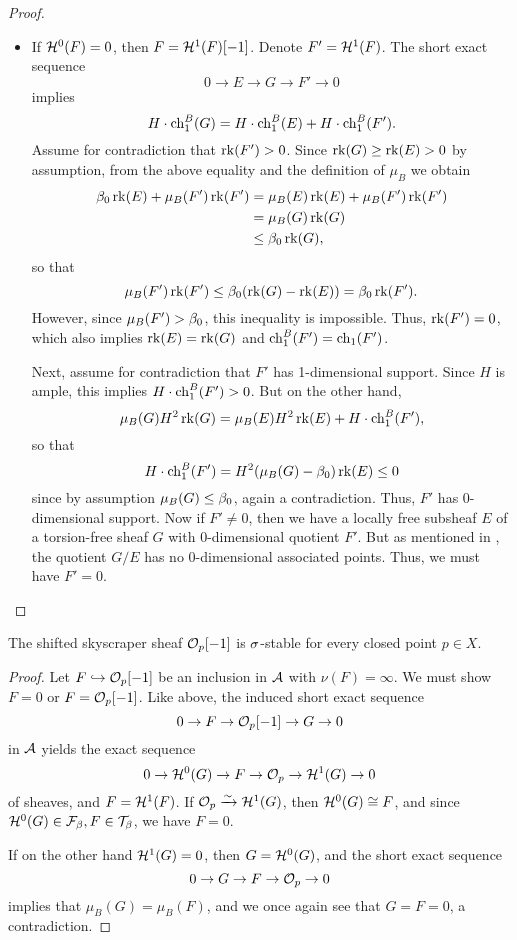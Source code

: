 \begin{proof}
\begin{itemize}
        \item If $\mathcal{H}^0(F) = 0$, then $F = \mathcal{H}^1(F)[-1]$. Denote $F' = \mathcal{H}^1(F)$. The short exact sequence
        \[ 0 \to E \to G \to F' \to 0 \]
        implies 
        \[ H\cdot \operatorname{\mathrm{ch}}^B_1(G) = H\cdot \operatorname{\mathrm{ch}}^B_1(E) + H\cdot \operatorname{\mathrm{ch}}^B_1(F'). \]
        Assume for contradiction that $\operatorname{\mathrm{rk}}(F') > 0$. Since $\operatorname{\mathrm{rk}}(G) \ge \operatorname{\mathrm{rk}}(E) > 0$ by assumption, from the above equality and the definition of $\mu_B$ we obtain
        \begin{align*} \beta_0 \operatorname{\mathrm{rk}}(E) + \mu_B(F') \operatorname{\mathrm{rk}}(F') & = \mu_B(E) \operatorname{\mathrm{rk}}(E) + \mu_B(F') \operatorname{\mathrm{rk}}(F') \\
        & = \mu_B(G) \operatorname{\mathrm{rk}}(G) \\
        & \le \beta_0 \operatorname{\mathrm{rk}}(G), \end{align*}
        so that
        \[ \mu_B(F') \operatorname{\mathrm{rk}}(F') \le \beta_0(\operatorname{\mathrm{rk}}(G) -  \operatorname{\mathrm{rk}}(E)) = \beta_0 \operatorname{\mathrm{rk}}(F'). \]
        However, since $\mu_B(F') > \beta_0$, this inequality is impossible. Thus, $\operatorname{\mathrm{rk}}(F') = 0$, which also implies $\operatorname{\mathrm{rk}}(E) = \operatorname{\mathrm{rk}}(G)$ and $\operatorname{\mathrm{ch}}^B_1(F') = \operatorname{\mathrm{ch}}_1(F')$. 
        
        Next, assume for contradiction that $F'$ has 1-dimensional support. Since $H$ is ample, this implies $H \cdot \operatorname{\mathrm{ch}}^B_1(F') > 0$. But on the other hand, 
        \[ \mu_B(G) H^2 \operatorname{\mathrm{rk}}(G) = \mu_B(E) H^2 \operatorname{\mathrm{rk}}(E) + H \cdot \operatorname{\mathrm{ch}}^B_1(F'), \]
        so that
        \[ H \cdot \operatorname{\mathrm{ch}}^B_1(F') = H^2 (\mu_B(G) - \beta_0)\operatorname{\mathrm{rk}}(E) \le 0 \]
        since by assumption $\mu_B(G) \le \beta_0$, again a contradiction. Thus, $F'$ has 0-dimensional support. Now if $F' \neq 0$, then we have a locally free subsheaf $E$ of a torsion-free sheaf $G$ with 0-di\-men\-sion\-al quotient $F'$. But as mentioned in \cite[Example 1.1.16]{HL}, the quotient $G/E$ has no 0-dimensional associated points. Thus, we must have $F' = 0$.
    \end{itemize} 
\end{proof}

\begin{lem}\label{skyscraperIsSigmaStable}
    The shifted skyscraper sheaf $\mathcal{O}_p[-1]$ is $\sigma$-stable for every closed point $p \in X$.
\end{lem}
\begin{proof}
    Let $F \hookrightarrow \mathcal{O}_p[-1]$ be an inclusion in $\mathcal{A}$ with $\nu(F) = \infty$. We must show $F = 0$ or $F = \mathcal{O}_p[-1]$. Like above, the induced short exact sequence
    \[ 0 \to F \to \mathcal{O}_p[-1] \to G \to 0 \]
    in $\mathcal{A}$ yields the exact sequence
    \[ 0 \to \mathcal{H}^0(G) \to F \to \mathcal{O}_p \to \mathcal{H}^1(G) \to 0 \]
    of sheaves, and $F = \mathcal{H}^1(F)$. If $\mathcal{O}_p \xrightarrow{\sim} \mathcal{H}^1(G)$, then $\mathcal{H}^0(G) \cong F$, and since $\mathcal{H}^0(G) \in \mathcal{F}_\beta, F \in \mathcal{T}_\beta$, we have $F = 0$.
    
    If on the other hand $\mathcal{H}^1(G) = 0$, then $G = \mathcal{H}^0(G)$, and the short exact sequence
    \[ 0 \to G \to F \to \mathcal{O}_p \to 0 \]
    implies that $\mu_B(G) = \mu_B(F)$, and we once again see that $G = F = 0$, a contradiction.
\end{proof}

